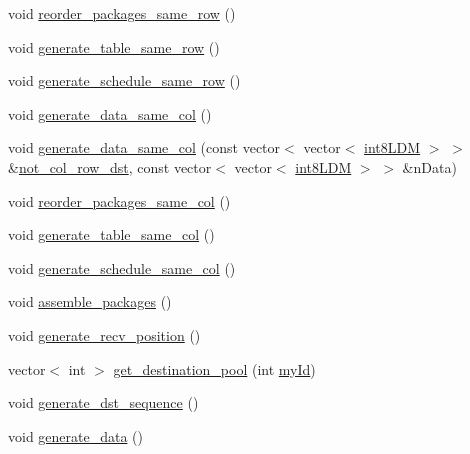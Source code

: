 \begin{DoxyCompactItemize}
\item 
void \mbox{\hyperlink{classRlmpiInitializer_a0ff3e38b34bebb951b36107951073c70}{reorder\+\_\+packages\+\_\+same\+\_\+row}} ()
\item 
void \mbox{\hyperlink{classRlmpiInitializer_ad1b5f8433f2f02756f4f522d552b8c0c}{generate\+\_\+table\+\_\+same\+\_\+row}} ()
\item 
void \mbox{\hyperlink{classRlmpiInitializer_a2e01c4b0ff789de3d50df5b7ead1e86d}{generate\+\_\+schedule\+\_\+same\+\_\+row}} ()
\item 
void \mbox{\hyperlink{classRlmpiInitializer_aa88c272b5b57d3ec44bbe183048e89b4}{generate\+\_\+data\+\_\+same\+\_\+col}} ()
\item 
void \mbox{\hyperlink{classRlmpiInitializer_a68f0277b57d6a61af97846cd9e100ddc}{generate\+\_\+data\+\_\+same\+\_\+col}} (const vector$<$ vector$<$ \mbox{\hyperlink{include_2RlmpiShared_8h_a69782ffde89d45e86308f10afedf08a6}{int8\+L\+DM}} $>$ $>$ \&\mbox{\hyperlink{classRlmpiInitializer_afb1edb3cd0884d3057dc3b6e89a9c6cb}{not\+\_\+col\+\_\+row\+\_\+dst}}, const vector$<$ vector$<$ \mbox{\hyperlink{include_2RlmpiShared_8h_a69782ffde89d45e86308f10afedf08a6}{int8\+L\+DM}} $>$ $>$ \&n\+Data)
\item 
void \mbox{\hyperlink{classRlmpiInitializer_a41a594eb50f4f0e3b44a0a28eb0af396}{reorder\+\_\+packages\+\_\+same\+\_\+col}} ()
\item 
void \mbox{\hyperlink{classRlmpiInitializer_aacafe4bfcbd2d27b6c63904ac431c966}{generate\+\_\+table\+\_\+same\+\_\+col}} ()
\item 
void \mbox{\hyperlink{classRlmpiInitializer_a9ae8fa3507bc5d2bee236e2320ae9ce1}{generate\+\_\+schedule\+\_\+same\+\_\+col}} ()
\item 
void \mbox{\hyperlink{classRlmpiInitializer_a03d8fdd916121bf1e703408abaf00492}{assemble\+\_\+packages}} ()
\item 
void \mbox{\hyperlink{classRlmpiInitializer_a6940fb6f728fcdb644d52787082b582f}{generate\+\_\+recv\+\_\+position}} ()
\item 
vector$<$ int $>$ \mbox{\hyperlink{classRlmpiInitializer_a4b50739703f39a77d03b223ac5f79cf6}{get\+\_\+destination\+\_\+pool}} (int \mbox{\hyperlink{test_2directSegment_2directSegmentIterator__slave_8c_aeaf12029768109487cb0540ba258af5a}{my\+Id}})
\item 
void \mbox{\hyperlink{classRlmpiInitializer_a50e9169843eaa848e5bff8ec3859a990}{generate\+\_\+dst\+\_\+sequence}} ()
\item 
void \mbox{\hyperlink{classRlmpiInitializer_ab93e99398a7d1ef2a21748260945d0ef}{generate\+\_\+data}} ()

\end{DoxyCompactItemize}
